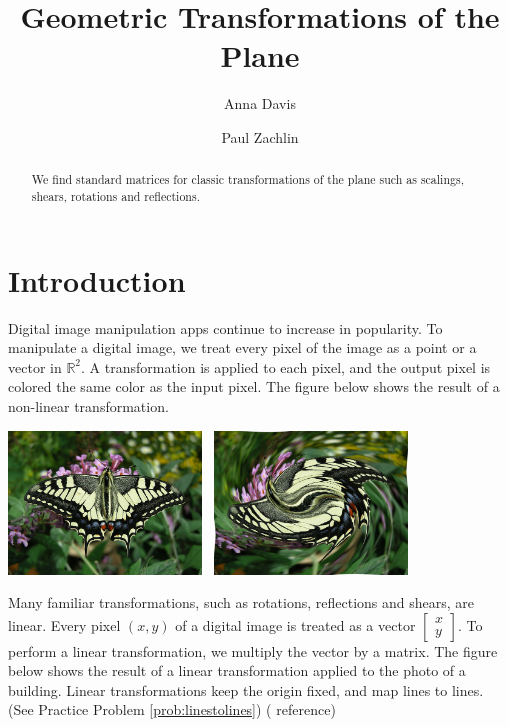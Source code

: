 \documentclass{ximera}
\author{Anna Davis \and Paul Zachlin} \title{Geometric Transformations of the Plane} \license{CC-BY 4.0}
\newcommand{\RR}{\mathbb{R}}
\begin{document}
\begin{abstract}
  We find standard matrices for classic transformations of the plane such as scalings, shears, rotations and reflections.
\end{abstract}
\maketitle

\section*{Introduction}
Digital image manipulation apps continue to increase in popularity.  To manipulate a digital image, we treat every pixel of the image as a point or a vector in $\RR^2$.  A transformation is applied to each pixel, and the output pixel is colored the same color as the input pixel.  The figure below shows the result of a non-linear transformation.

    \begin{center}
\includegraphics[height=1.5in]{butterfly.jpg}~
 \includegraphics[height=1.5in]{swirledbutterfly.jpg}    
 \end{center}

Many familiar transformations, such as rotations, reflections and shears, are linear. Every pixel $(x, y)$ of a digital image is treated as a vector $\begin{bmatrix}
x\\
y
\end{bmatrix}$.  To perform a linear transformation, we multiply the vector by a matrix.  The figure below shows the result of a linear transformation applied to the photo of a building.  Linear transformations keep the origin fixed, and map lines to lines. (See Practice Problem \ref{prob:linestolines})  ({\color{red} reference})
\end{document}
